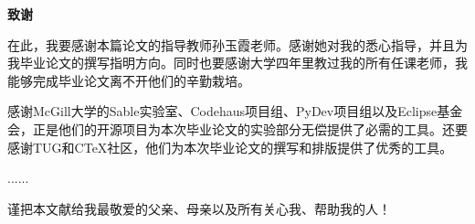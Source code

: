 ﻿\begin{center}
  \textbf{\songti 致谢}
\end{center}\par
{}\songti
在此，我要感谢本篇论文的指导教师孙玉霞老师。感谢她对我的悉心指导，并且为我毕业论文的撰写指明方向。同时也要感谢大学四年里教过我的所有任课老师，我能够完成毕业论文离不开他们的辛勤栽培。\par
感谢McGill大学的Sable实验室、Codehaus项目组、PyDev项目组以及Eclipse基金会，正是他们的开源项目为本次毕业论文的实验部分无偿提供了必需的工具。还要感谢TUG和CTeX社区，他们为本次毕业论文的撰写和排版提供了优秀的工具。\par
......\par
谨把本文献给我最敬爱的父亲、母亲以及所有关心我、帮助我的人！\par
